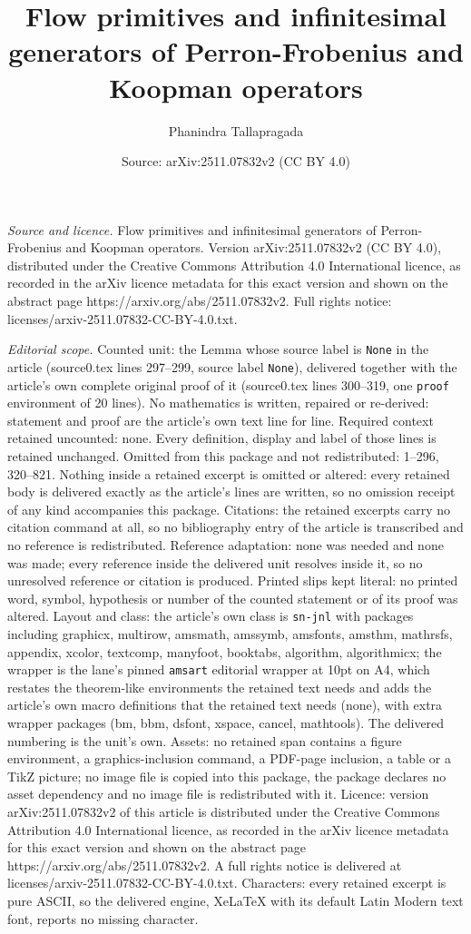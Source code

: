 \documentclass[10pt,a4paper]{amsart}
\title[Flow primitives and infinitesimal generators of Perron-Frobe]{Flow primitives and infinitesimal generators of Perron-Frobenius and Koopman operators}
\author{Phanindra Tallapragada}
\date{Source: arXiv:2511.07832v2 (CC BY 4.0)}
\begin{document}
\maketitle

\noindent\emph{Source and licence.} Flow primitives and infinitesimal generators of Perron-Frobenius and Koopman operators. Version arXiv:2511.07832v2 (CC BY 4.0), distributed under the Creative Commons Attribution 4.0 International licence, as recorded in the arXiv licence metadata for this exact version and shown on the abstract page https://arxiv.org/abs/2511.07832v2. Full rights notice: licenses/arxiv-2511.07832-CC-BY-4.0.txt.\par\smallskip

\noindent\textit{Editorial scope.} Counted unit: the Lemma whose source label is \texttt{None} in the article (source0.tex lines 297--299, source label \texttt{None}), delivered together with the article's own complete original proof of it (source0.tex lines 300--319, one \texttt{proof} environment of 20 lines). No mathematics is written, repaired or re-derived: statement and proof are the article's own text line for line. Required context retained uncounted: none. Every definition, display and label of those lines is retained unchanged. Omitted from this package and not redistributed: 1--296, 320--821. Nothing inside a retained excerpt is omitted or altered: every retained body is delivered exactly as the article's lines are written, so no omission receipt of any kind accompanies this package. Citations: the retained excerpts carry no citation command at all, so no bibliography entry of the article is transcribed and no reference is redistributed. Reference adaptation: none was needed and none was made; every reference inside the delivered unit resolves inside it, so no unresolved reference or citation is produced. Printed slips kept literal: no printed word, symbol, hypothesis or number of the counted statement or of its proof was altered. Layout and class: the article's own class is \texttt{sn-jnl} with packages including graphicx, multirow, amsmath, amssymb, amsfonts, amsthm, mathrsfs, appendix, xcolor, textcomp, manyfoot, booktabs, algorithm, algorithmicx; the wrapper is the lane's pinned \texttt{amsart} editorial wrapper at 10pt on A4, which restates the theorem-like environments the retained text needs and adds the article's own macro definitions that the retained text needs (none), with extra wrapper packages (bm, bbm, dsfont, xspace, cancel, mathtools). The delivered numbering is the unit's own. Assets: no retained span contains a figure environment, a graphics-inclusion command, a PDF-page inclusion, a table or a TikZ picture; no image file is copied into this package, the package declares no asset dependency and no image file is redistributed with it. Licence: version arXiv:2511.07832v2 of this article is distributed under the Creative Commons Attribution 4.0 International licence, as recorded in the arXiv licence metadata for this exact version and shown on the abstract page https://arxiv.org/abs/2511.07832v2. A full rights notice is delivered at licenses/arxiv-2511.07832-CC-BY-4.0.txt. Characters: every retained excerpt is pure ASCII, so the delivered engine, XeLaTeX with its default Latin Modern text font, reports no missing character.
\end{document}

